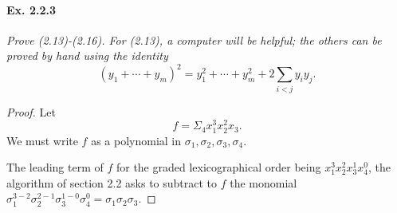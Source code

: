 \documentclass[11pt,a4paper]{article}
\begin{document}
\paragraph{Ex. 2.2.3}

{\it Prove (2.13)-(2.16). For (2.13), a computer will be helpful; the others can be proved by hand using the identity
$$(y_1+\cdots+y_m)^2 = y_1^2+\cdots+y_m^2 + 2 \sum_{i<j}y_i y_j.$$
}

\begin{proof}


Let $$ f= \Sigma_4x_1^3x_2^2x_3.$$
We must write  $f$ as a polynomial in $\sigma_1,\sigma_2,\sigma_3,\sigma_4$.

 The leading term of $f$ for the graded lexicographical order being  $x_1^3x_2^2x_3^1x_4^0$, the algorithm of section 2.2 asks to subtract to  $f$ the monomial $\sigma_1^{3-2}\sigma_2^{2-1} \sigma_3^{1-0} \sigma_4^0 = \sigma_1\sigma_2\sigma_3$.


\end{proof}
\end{document}
